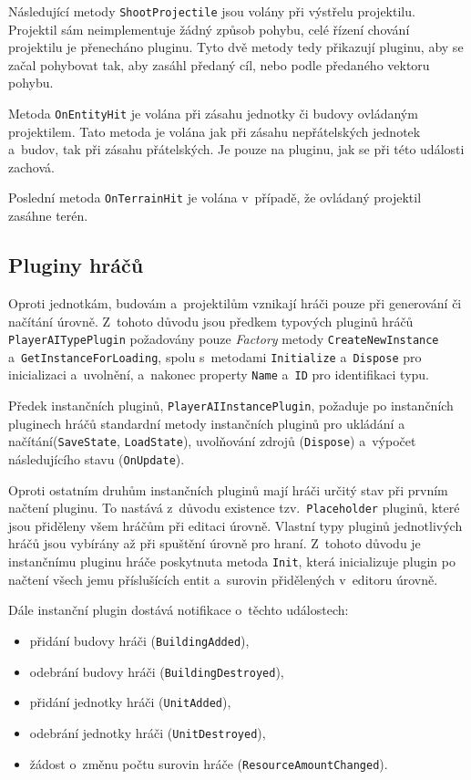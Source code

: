 Následující metody \texttt{ShootProjectile} jsou volány při výstřelu projektilu. Projektil sám neimplementuje žádný způsob pohybu, celé řízení chování projektilu je přenecháno pluginu. Tyto dvě metody tedy přikazují pluginu, aby se začal pohybovat tak, aby zasáhl předaný cíl, nebo podle předaného vektoru pohybu.

Metoda \texttt{OnEntityHit} je volána při zásahu jednotky či budovy ovládaným projektilem. Tato metoda je volána jak při zásahu nepřátelských jednotek a~budov, tak při zásahu přátelských. Je pouze na pluginu, jak se při této události zachová.

Poslední metoda \texttt{OnTerrainHit} je volána v~případě, že ovládaný projektil zasáhne terén.

\subsection{Pluginy hráčů}
Oproti jednotkám, budovám a~projektilům vznikají hráči pouze při generování či načítání úrovně. Z~tohoto důvodu jsou předkem typových pluginů hráčů \texttt{PlayerAITypePlugin} požadovány pouze \textit{Factory} metody \texttt{CreateNewInstance} a~\texttt{GetInstanceForLoading}, spolu s~metodami \texttt{Initialize} a~\texttt{Dispose} pro inicializaci a~uvolnění, a~nakonec property \texttt{Name} a~\texttt{ID} pro identifikaci typu.


Předek instančních pluginů, \texttt{PlayerAIInstancePlugin}, požaduje po instančních pluginech hráčů standardní metody instančních pluginů pro ukládání a načítání(\texttt{SaveState}, \texttt{LoadState}), uvolňování zdrojů (\texttt{Dispose}) a~výpočet následujícího stavu (\texttt{OnUpdate}).

Oproti ostatním druhům instančních pluginů mají hráči určitý stav při prvním načtení pluginu. To nastává z~důvodu existence tzv.~\texttt{Placeholder} pluginů, které jsou přiděleny všem hráčům při editaci úrovně. Vlastní typy pluginů jednotlivých hráčů jsou vybírány až při spuštění úrovně pro hraní. Z~tohoto důvodu je instančnímu pluginu hráče poskytnuta metoda \texttt{Init}, která inicializuje plugin po načtení všech jemu příslušících entit a~surovin přidělených v~editoru úrovně.

Dále instanční plugin dostává notifikace o~těchto událostech:

\begin{itemize}
	\item přidání budovy hráči (\texttt{BuildingAdded}),
	\item odebrání budovy hráči (\texttt{BuildingDestroyed}),
	\item přidání jednotky hráči (\texttt{UnitAdded}),
	\item odebrání jednotky hráči (\texttt{UnitDestroyed}),
	\item žádost o~změnu počtu surovin hráče (\texttt{ResourceAmountChanged}).
\end{itemize}

